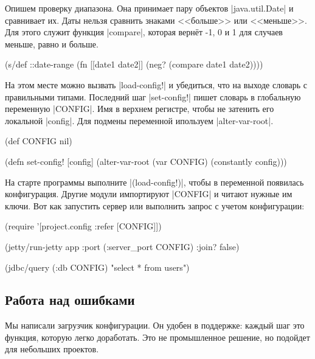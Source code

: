 Опишем проверку диапазона. Она принимает пару объектов \spverb|java.util.Date| и
сравнивает их. Даты нельзя сравнить знаками <<больше>> или <<меньше>>. Для этого
служит функция \spverb|compare|, которая верн\"{е}т -1, 0 и 1 для случаев меньше,
равно и больше.

\begin{english}
  \begin{clojure}
(s/def ::date-range
  (fn [[date1 date2]]
    (neg? (compare date1 date2))))
  \end{clojure}
\end{english}

На этом месте можно вызвать \spverb|load-config!| и убедиться, что на выходе
словарь с правильными типами. Последний шаг \spverb|set-config!| пишет словарь в
глобальную переменную \spverb|CONFIG|. Имя в верхнем регистре, чтобы не затенить
его локальной \spverb|config|. Для подмены переменной ипользуем
\spverb|alter-var-root|.

\begin{english}
  \begin{clojure}
(def CONFIG nil)

(defn set-config!
  [config]
  (alter-var-root (var CONFIG) (constantly config)))
  \end{clojure}
\end{english}

На старте программы выполните \spverb|(load-config!)|, чтобы в переменной
появилась конфигурация. Другие модули импортируют \spverb|CONFIG| и читают
нужные им ключи. Вот как запустить сервер или выполнить запрос с учетом
конфигурации:

\begin{english}
  \begin{clojure}
(require '[project.config :refer [CONFIG]])

(jetty/run-jetty app {:port (:server_port CONFIG)
                      :join? false})

(jdbc/query (:db CONFIG) "select * from users")
  \end{clojure}
\end{english}

\subsection{Работа над ошибками}

Мы написали загрузчик конфигурации. Он удобен в поддержке: каждый шаг это
функция, которую легко доработать. Это не промышленное решение, но подойдет для
небольших проектов.

